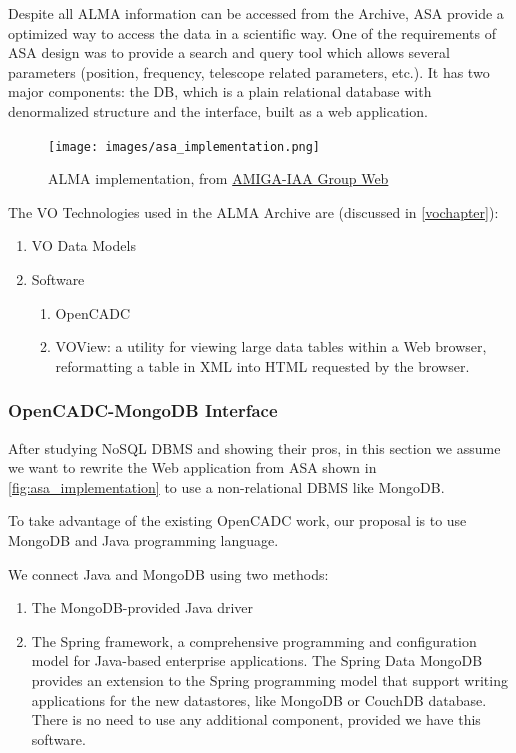 

Despite all ALMA information can be accessed from the Archive, ASA provide a optimized way to access the data in a scientific way. One of the requirements of ASA design was to provide a search and query tool which allows several parameters (position, frequency, telescope related parameters, etc.). It has two major components: the DB, which is a plain relational database with denormalized structure and the interface, built as a web application.

\label{fig:asa_implementation}
\begin{figure}
\centering
\texttt{[image: images/asa\_implementation.png]}
\caption{ALMA implementation, from  \href{http://amiga.iaa.es/FCKeditor/UserFiles/File/VOandALMAarchive_web.pdf}{AMIGA-IAA Group Web}}
\end{figure}


The VO Technologies used in the ALMA Archive are (discussed in \ref{vochapter}):

\begin{enumerate}
\item VO Data Models
\item Software
  \begin{enumerate}
    \item OpenCADC
    \item VOView: a utility for viewing large data tables within a Web browser, reformatting a table in XML into HTML requested by the browser.
  \end{enumerate}
\end{enumerate}

\subsubsection{OpenCADC-MongoDB Interface}


After studying NoSQL DBMS and showing their pros, in this section we assume we want to rewrite the Web application from ASA shown in \ref{fig:asa_implementation} to use a non-relational DBMS like MongoDB.

To take advantage of the existing OpenCADC work, our proposal is to use MongoDB and Java programming language.

We connect Java and MongoDB using two methods:

\begin{enumerate}

\item The MongoDB-provided Java driver 

\item The Spring framework, a comprehensive programming and configuration model for Java-based enterprise applications. The Spring Data MongoDB  provides an extension to the Spring programming model that support writing applications for the new datastores, like MongoDB or CouchDB database. There is no need to use any additional component, provided we have this software.

\end{enumerate}

